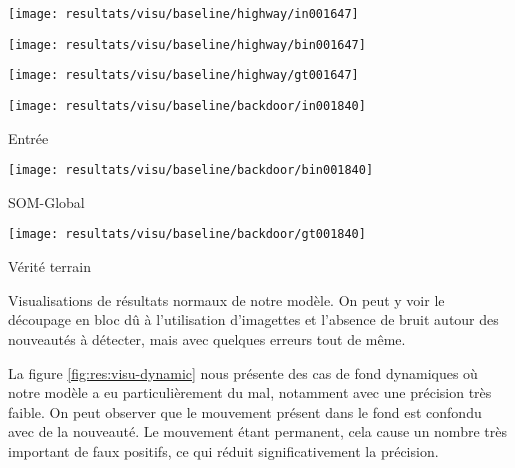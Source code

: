 	\begin{figureth}
		\begin{subfigureth}{.32\textwidth}
			\texttt{[image: resultats/visu/baseline/highway/in001647]}
		\end{subfigureth}
		\begin{subfigureth}{.32\textwidth}
			\texttt{[image: resultats/visu/baseline/highway/bin001647]}
		\end{subfigureth}
		\begin{subfigureth}{.32\textwidth}
			\texttt{[image: resultats/visu/baseline/highway/gt001647]}
		\end{subfigureth}

		\begin{subfigureth}{.32\textwidth}
			\texttt{[image: resultats/visu/baseline/backdoor/in001840]} \caption{Entrée}
		\end{subfigureth}
		\begin{subfigureth}{.32\textwidth}
			\texttt{[image: resultats/visu/baseline/backdoor/bin001840]} \caption{SOM-Global}
		\end{subfigureth}
		\begin{subfigureth}{.32\textwidth}
			\texttt{[image: resultats/visu/baseline/backdoor/gt001840]} \caption{Vérité terrain}
		\end{subfigureth}

		\caption[Visualisation résultats normaux]{Visualisations de résultats normaux de notre modèle. On peut y voir le découpage en bloc dû à l'utilisation d'imagettes et l'absence de bruit autour des nouveautés à détecter, mais avec quelques erreurs tout de même.}\label{fig:res:visu-baseline}
	\end{figureth}

	La figure \ref{fig:res:visu-dynamic} nous présente des cas de fond dynamiques où notre modèle a eu particulièrement du mal, notamment avec une précision très faible. On peut observer que le mouvement présent dans le fond est confondu avec de la nouveauté. Le mouvement étant permanent, cela cause un nombre très important de faux positifs, ce qui réduit significativement la précision.  


